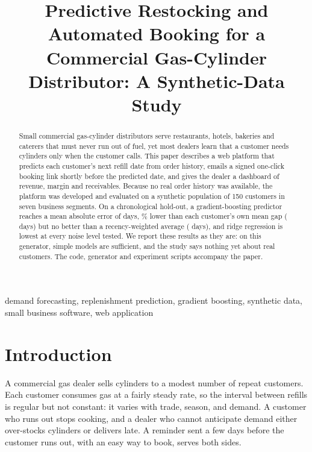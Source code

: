 \documentclass[conference]{IEEEtran}
\begin{document}
\title{Predictive Restocking and Automated Booking for a Commercial Gas-Cylinder Distributor: A Synthetic-Data Study}

\author{
}

\maketitle

\begin{abstract}
Small commercial gas-cylinder distributors serve restaurants, hotels, bakeries and caterers that must never run out of fuel, yet most dealers learn that a customer needs cylinders only when the customer calls. This paper describes a web platform that predicts each customer's next refill date from order history, emails a signed one-click booking link shortly before the predicted date, and gives the dealer a dashboard of revenue, margin and receivables. Because no real order history was available, the platform was developed and evaluated on a synthetic population of 150 customers in seven business segments. On a chronological hold-out, a gradient-boosting predictor reaches a mean absolute error of \MaeGB{} days, \GainOwn\% lower than each customer's own mean gap (\MaeOwn{} days) but no better than a recency-weighted average (\MaeEWMA{} days), and ridge regression is lowest at every noise level tested. We report these results as they are: on this generator, simple models are sufficient, and the study says nothing yet about real customers. The code, generator and experiment scripts accompany the paper.
\end{abstract}

\begin{IEEEkeywords}
demand forecasting, replenishment prediction, gradient boosting, synthetic data, small business software, web application
\end{IEEEkeywords}

\section{Introduction}
A commercial gas dealer sells cylinders to a modest number of repeat customers. Each customer consumes gas at a fairly steady rate, so the interval between refills is regular but not constant: it varies with trade, season, and demand. A customer who runs out stops cooking, and a dealer who cannot anticipate demand either over-stocks cylinders or delivers late. A reminder sent a few days before the customer runs out, with an easy way to book, serves both sides.
\end{document}
